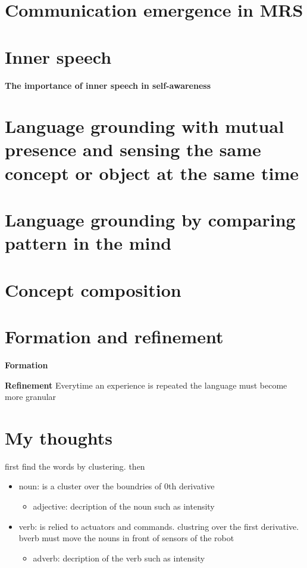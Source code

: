 \section{Communication emergence in MRS}

\section{Inner speech}
    \textbf{The importance of inner speech in self-awareness} 

\section{Language grounding with mutual presence and sensing the same concept or object at the same time}

\section{Language grounding by comparing pattern in the mind}

\section{Concept composition}

\section{Formation and refinement}
    \textbf{Formation}

    \textbf{Refinement} Everytime an experience is repeated the language must become more granular
    
\section{My thoughts}
first find the words by clustering. then
\begin{itemize}
    \item noun: is a cluster over the boundries of 0th derivative
        \begin{itemize}
            \item adjective: decription of the noun such as intensity
        \end{itemize}
    \item verb: is relied to actuators and commands. clustring over the first derivative. bverb must move the nouns in front of sensors of the robot
        \begin{itemize}
            \item adverb: decription of the verb such as intensity
        \end{itemize}
\end{itemize}

